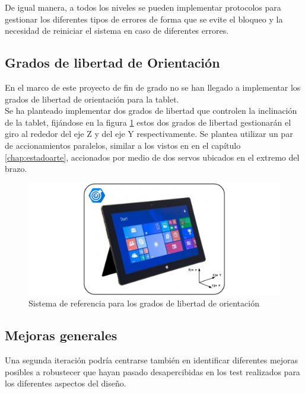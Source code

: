 De igual manera, a todos los niveles se pueden implementar protocolos para gestionar los diferentes tipos de errores de forma que se evite el bloqueo y la necesidad de reiniciar el sistema en caso de diferentes errores.

\subsection{Grados de libertad de Orientación}

En el marco de este proyecto de fin de grado no se han llegado a implementar los grados de libertad de orientación para la tablet. 
\\

Se ha planteado implementar dos grados de libertad que controlen la inclinación de la tablet, fijándose en la figura \ref{fig:Conclusiones:orientacion_tablet} estos dos grados de libertad gestionarán el giro al rededor del eje Z y del eje Y respectivamente. Se plantea utilizar un par de accionamientos paralelos, similar a los vistos en \cite{Chung2009} en el capítulo \ref{chap:estadoarte}, accionados por medio de dos servos ubicados en el extremo del brazo.

\begin{figure}[H]
	\centering
	\includegraphics[width=1\textwidth]{figuras/Imagenes_Conclusion/orientacion_tablet.jpg}
	\caption{Sistema de referencia para los grados de libertad de orientación}
	\label{fig:Conclusiones:orientacion_tablet}
\end{figure}

\subsection{Mejoras generales}

Una segunda iteración podría centrarse también en identificar diferentes mejoras posibles a robustecer que hayan pasado desapercibidas en los test realizados para los diferentes aspectos del diseño.